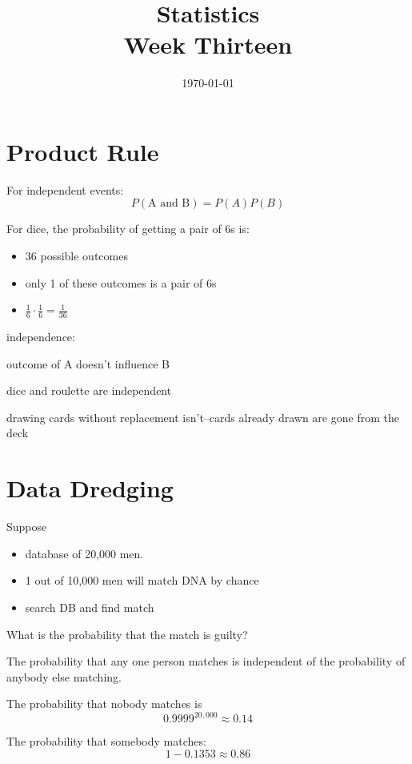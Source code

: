 \documentclass[landscape]{exam}
\title{Statistics \\ Week Thirteen}
\date{\today}
\author{}
\begin{document}
  \maketitle
  \tableofcontents

  \section{Product Rule}

  For independent events:
  \[
    P(\text{A and B}) = P(A) P(B)
  \]

  For dice, the probability of getting a pair of 6s is:
  \begin{itemize}
    \item 36 possible outcomes
    \item only 1 of these outcomes is a pair of 6s
    \item $\frac{1}{6} \cdot \frac{1}{6} = \frac{1}{36}$
  \end{itemize}

  independence:
  \begin{itemize*}
    \item outcome of A doesn't influence B
    \item dice and roulette are independent
    \item drawing cards without replacement isn't--cards already drawn are gone
      from the deck
  \end{itemize*}

  \section{Data Dredging}
  Suppose 
  \begin{itemize}
    \item database of 20,000 men.
    \item 1 out of 10,000 men will match DNA by chance
    \item search DB and find match
  \end{itemize}

  What is the probability that the match is guilty?

  \begin{solution}
    The probability that any one person matches is independent of the
    probability of anybody else matching.

    The probability that nobody matches is
    \[
      0.9999^{20,000} \approx 0.14
    \]

    The probability that somebody matches:
    \[
      1 - 0.1353 \approx 0.86
    \]
  \end{solution}
\end{document}
